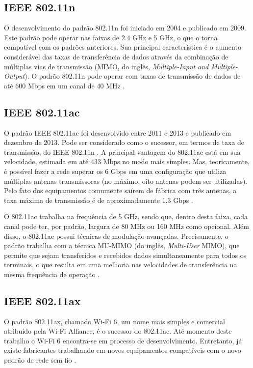\subsection{IEEE 802.11n}
\label{subsec:802-11n}

O desenvolvimento do padrão 802.11n foi iniciado em 2004 e publicado em 2009. Este padrão pode operar nas faixas de 2.4 GHz e 5 GHz, o que o torna compatível com os padrões anteriores. Sua principal característica é o aumento considerável das taxas de transferência de dados através da combinação de múltiplas vias de transmissão (MIMO, do inglês, \textit{Multiple-Input and Multiple-Output}). O padrão 802.11n pode operar com taxas de transmissão de dados de até 600 Mbps em um canal de 40 MHz \cite{moraes2010}.

\subsection{IEEE 802.11ac}
\label{subsec:802-11ac}

O padrão IEEE 802.11ac foi desenvolvido entre 2011 e 2013 e publicado em dezembro de 2013. Pode ser considerado como o sucessor, em termos de taxa de transmissão, do IEEE 802.11n \cite{alecrim2008site}.
A principal vantagem do 802.11ac está em sua velocidade, estimada em até 433 Mbps no modo mais simples. Mas, teoricamente, é possível fazer a rede superar os 6 Gbps em uma configuração que utiliza múltiplas antenas transmissoras (no máximo, oito antenas podem ser utilizadas). Pelo fato dos equipamentos comumente saírem de fábrica com três antenas, a taxa máxima de transmissão é de aproximadamente 1,3 Gbps \cite{alecrim2008site}.

O 802.11ac trabalha na frequência de 5 GHz, sendo que, dentro desta faixa, cada canal pode ter, por padrão, largura de 80 MHz ou 160 MHz como opcional. Além disso, o 802.11ac possui técnicas de modulação avançadas. Precisamente, o padrão trabalha com a técnica MU-MIMO (do inglês, \textit{Multi-User} MIMO), que permite que sejam transferidos e recebidos dados simultaneamente para todos os terminais, o que resulta em uma melhoria nas velocidades de transferência na mesma frequência de operação \cite{alecrim2008site}.

\subsection{IEEE 802.11ax}
\label{subsec:802-11ax}

O padrão 802.11ax, chamado Wi-Fi 6, um nome mais simples e comercial atribuído pela Wi-Fi Alliance, é o sucessor do 802.11ac. Até momento deste trabalho o Wi-Fi 6 encontra-se em processo de desenvolvimento. Entretanto, já existe fabricantes trabalhando em novos equipamentos compatíveis com o novo padrão de rede sem fio \cite{plaza2018site}.


